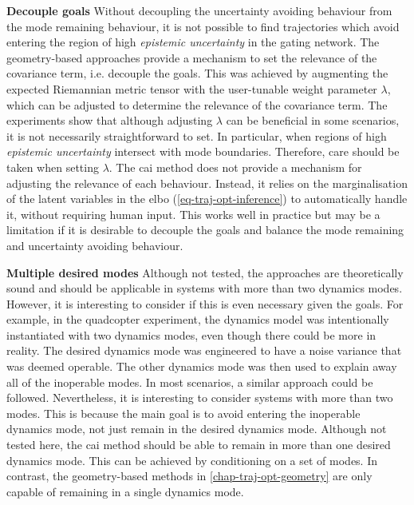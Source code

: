 \documentclass{mimosis-class/mimosis}
\numberwithin{equation}{chapter}
\begin{document}
{\textbf{Decouple goals}
Without decoupling the uncertainty avoiding behaviour from the mode remaining behaviour,
it is not possible to find trajectories which avoid entering the region of high \emph{epistemic uncertainty} in the
gating network.
The geometry-based approaches provide a mechanism to set the relevance of the covariance term, i.e. decouple the goals.
This was achieved by augmenting the expected Riemannian metric tensor with the user-tunable weight
parameter \(\lambda\), which can be adjusted to determine the relevance of the covariance term.
The experiments show that although adjusting \(\lambda\) can be beneficial in some scenarios, it is not necessarily
straightforward to set.
In particular, when regions of high \emph{epistemic uncertainty} intersect with mode boundaries.
Therefore, care should be taken when setting \(\lambda\).
The \acrshort{cai} method does not provide a mechanism for adjusting the relevance of each behaviour.
Instead, it relies on the marginalisation of the latent variables in the \acrshort{elbo}
(\cref{eq-traj-opt-inference}) to automatically handle it, without requiring human input.
This works well in practice but may be a limitation if it is desirable to decouple the goals and
balance the mode remaining and uncertainty avoiding behaviour.


\textbf{Multiple desired modes}
Although not tested, the approaches are theoretically sound and should be applicable in systems with more
than two dynamics modes.
However, it is interesting to consider if this is even necessary given the goals.
For example, in the quadcopter experiment, the dynamics model was intentionally instantiated
with two dynamics modes, even though there could be more in reality.
The desired dynamics mode was engineered to have a noise variance that was deemed operable.
The other dynamics mode was then used to explain away all of the inoperable modes.
In most scenarios, a similar approach could be followed.
Nevertheless, it is interesting to consider systems with more than two modes.
This is because the main goal is to avoid entering the inoperable dynamics mode, not just remain in the desired
dynamics mode.
Although not tested here, the \acrshort{cai} method should be able to remain
in more than one desired dynamics mode.
This can be achieved by conditioning on a set of modes.
In contrast, the geometry-based methods in \cref{chap-traj-opt-geometry} are only capable of remaining in a single
dynamics mode.

}
\end{document}
